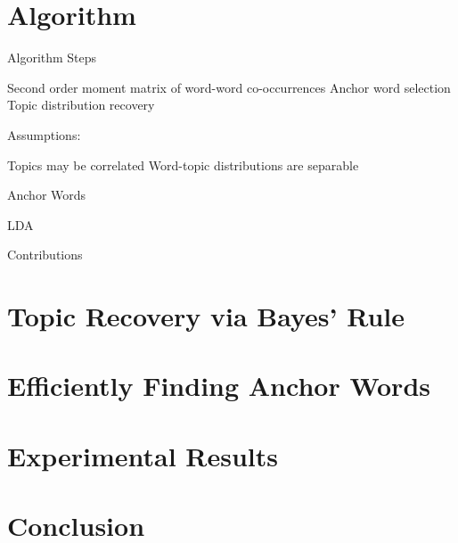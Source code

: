 \documentclass{lecture}
\begin{document}
\section[Algorithm]{Algorithm}

\begin{plain}{Algorithm}
Steps
\begin{enumerate}
	\p Second order moment matrix of word-word co-occurrences
	\p Anchor word selection
	\p Topic distribution recovery
\end{enumerate}

Assumptions:
	\begin{itemize}
		\p Topics may be correlated
		\p Word-topic distributions are separable
	\end{itemize}
\end{plain}

\begin{plain}{Anchor Words}
\end{plain}

\begin{plain}{LDA}
\end{plain}



\begin{plain}{Contributions}
\end{plain}

\section[Topic Recovery]{Topic Recovery via Bayes' Rule}

\section[Anchor Words]{Efficiently Finding Anchor Words}

\section[Results]{Experimental Results}

\section[Conclusion]{Conclusion}
\end{document}
